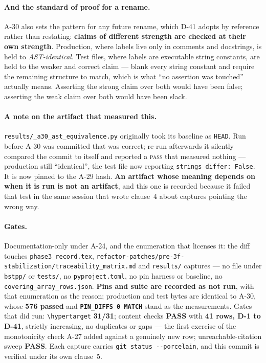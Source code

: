 \documentclass[
  10pt,
]{article}
\begin{document}
\paragraph{And the standard of proof for a rename.}
A-30 also sets the pattern for any future rename, which D-41 adopts by reference rather than restating: \textbf{claims of different strength are checked at their own strength}. Production, where labels live only in comments and docstrings, is held to \emph{AST-identical}. Test files, where labels are executable string constants, are held to the weaker and correct claim --- blank every string constant and require the remaining structure to match, which is what ``no assertion was touched'' actually means. Asserting the strong claim over both would have been false; asserting the weak claim over both would have been slack.

\paragraph{A note on the artifact that measured this.}
\texttt{results/\allowbreak{}\_a30\_ast\_equivalence.py} originally took its baseline as \texttt{HEAD}. Run before A-30 was committed that was correct; re-run afterwards it silently compared the commit to itself and reported a \textsc{pass} that measured nothing --- production still ``identical'', the test file now reporting \texttt{strings differ: False}. It is now pinned to the A-29 hash. \textbf{An artifact whose meaning depends on when it is run is not an artifact}, and this one is recorded because it failed that test in the same session that wrote clause~4 about captures pointing the wrong way.

\paragraph{Gates.}
Documentation-only under A-24, and the enumeration that licenses it: the diff touches \texttt{phase3\_record.tex}, \texttt{refactor-patches/\allowbreak{}pre-3f-stabilization/\allowbreak{}traceability\_matrix.md} and \texttt{results/} captures --- no file under \texttt{bstpp/} or \texttt{tests/}, no \texttt{pyproject.toml}, no pin harness or baseline, no \texttt{covering\_array\_rows.json}. \textbf{Pins and suite are recorded as not run}, with that enumeration as the reason; production and test bytes are identical to A-30, whose \textbf{576 passed} and \textbf{\texttt{PIN\_DIFFS 0 MATCH}} stand as the measurements. Gates that did run: \texttt{\textbackslash hypertarget} \textbf{31/31}; content checks \textbf{PASS} with \textbf{41 rows, D-1 to D-41}, strictly increasing, no duplicates or gaps --- the first exercise of the monotonicity check A-27 added against a genuinely new row; unreachable-citation sweep \textbf{PASS}. Each capture carries \texttt{git status -{}-porcelain}, and this commit is verified under its own clause~5.
\end{document}
